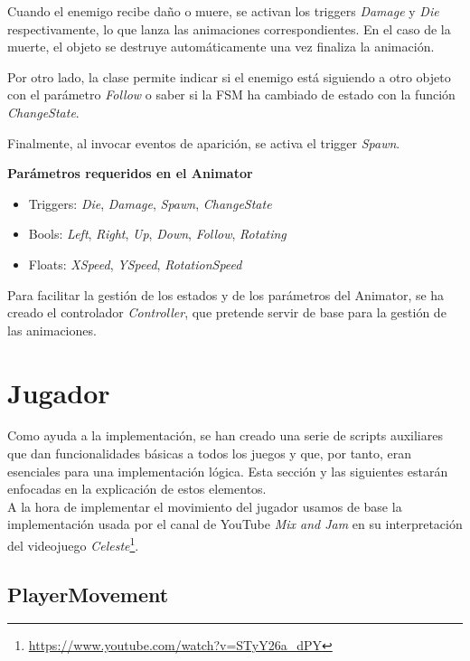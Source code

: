 Cuando el enemigo recibe daño o muere, se activan los triggers \textit{Damage} y \textit{Die} respectivamente, lo que lanza las animaciones correspondientes. En el caso de la muerte, el objeto se destruye automáticamente una vez finaliza la animación. 

Por otro lado, la clase permite indicar si el enemigo está siguiendo a otro objeto con el parámetro \textit{Follow} o saber si la FSM ha cambiado de estado con la función \textit{ChangeState}.

Finalmente, al invocar eventos de aparición, se activa el trigger \textit{Spawn}.

\textbf{Parámetros requeridos en el Animator}
\begin{itemize}
	\item Triggers: \textit{Die}, \textit{Damage}, \textit{Spawn}, \textit{ChangeState}
	\item Bools: \textit{Left}, \textit{Right}, \textit{Up}, \textit{Down}, \textit{Follow}, \textit{Rotating}
	\item Floats: \textit{XSpeed}, \textit{YSpeed}, \textit{RotationSpeed}
\end{itemize}

Para facilitar la gestión de los estados y de los parámetros del Animator, se ha creado el controlador \textit{Controller}, que pretende servir de base para la gestión de las animaciones.

\section{Jugador}

Como ayuda a la implementación, se han creado una serie de scripts auxiliares que dan funcionalidades básicas a todos los juegos y que, por tanto, eran esenciales para una implementación lógica. Esta sección y las siguientes estarán enfocadas en la explicación de estos elementos.\\
A la hora de implementar el movimiento del jugador usamos de base la implementación usada por el canal de YouTube \textit{Mix and Jam} en su interpretación del videojuego \textit{Celeste}\footnote{\url{https://www.youtube.com/watch?v=STyY26a_dPY}}.

\subsection{PlayerMovement}

